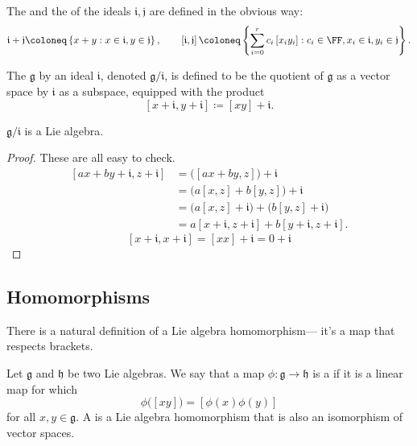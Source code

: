 \documentclass{article}
\newcommand{\lb}[1]{\ensuremath{\left[{#1}\right]}}
\newcommand{\frkg}{{\ensuremath{\mathfrak{g}}}}
\newcommand{\frkh}{{\ensuremath{\mathfrak{h}}}}
\newcommand{\frki}{{\ensuremath{\mathfrak{i}}}}
\newcommand{\frkj}{{\ensuremath{\mathfrak{j}}}}
\begin{document}
The  and the  of the ideals $\frki, \frkj$ are defined in the obvious way:
\[
    \frki + \frkj
    \coloneq
    \left\{
        x + y : x \in \frki, y \in \frkj
    \right\},\qquad
    \lb{\frki,\frkj}
    \coloneq
    \left\{
        \sum_{i=0}^rc_i\lb{x_iy_i}
        :
        c_i \in \FF, x_i \in \frki, y_i \in \frkj
    \right\}.
\]

\begin{definition}
    The  $\frkg$ by an ideal $\frki$, denoted $\frkg/\frki$, is defined to be the quotient of $\frkg$ as a vector space by $\frki$ as a subspace, equipped with the product
    \[
        \lb{x+\frki,y+\frki}
        \coloneq
        \lb{xy} + \frki.
    \]
\end{definition}

\begin{proposition}
    $\frkg/\frki$ is a Lie algebra.
\end{proposition}
\begin{proof}
    These are all easy to check.
    \begin{align*}
        \lb{ax+by+\frki,z+\frki}
        &=
        \Big(\lb{ax+by,z}\Big) + \frki
        \\\
        &=
        \Big(
            a\lb{x,z}  
            +
            b\lb{y,z}  
        \Big)
        + \frki
        \\
        &=
        \Big(
            a\lb{x,z} + \frki
        \Big)
        +
        \Big(
            b\lb{y,z} + \frki 
        \Big)
        \\
        &=
        a\lb{x+\frki,z+\frki} + b\lb{y+\frki,z+\frki}.
    \end{align*}
    \[
        \lb{x+\frki,x+\frki}
        =
        \lb{xx} + \frki
        =
        0 + \frki
    \]
\end{proof}

\newcommand{\barphi}{\ensuremath{\overline{\phi}}}

\subsection{Homomorphisms}

There is a natural definition of a Lie algebra homomorphism--- it's a map that respects brackets.

\begin{definition}
    Let $\frkg$ and $\frkh$ be two Lie algebras.
    We say that a map $\phi: \frkg \to \frkh$ is a  if it is a linear map for which
    \[
        \phi\Big(\lb{xy}\Big)
        =
        \lb{\phi(x)\phi(y)}
    \]
    for all $x,y \in \frkg$. 
    A  is a Lie algebra homomorphism that is also an isomorphism of vector spaces.
\end{definition}
\end{document}
